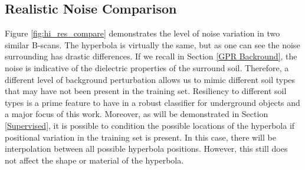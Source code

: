 \subsection{Realistic Noise Comparison}\label{background comparison}
\hspace{0.5in}Figure \ref{fig:hi_res_compare} demonstrates the level of noise variation in two similar B-scans. The hyperbola is virtually the same, but as one can see the noise surrounding has drastic differences. If we recall in Section \ref{GPR Backround}, the noise is indicative of the dielectric properties of the surround soil. Therefore, a different level of background perturbation allows us to mimic different soil types that may have not been present in the training set. Resiliency to different soil types is a prime feature to have in a robust classifier for underground objects and a major focus of this work.  Moreover, as will be demonstrated in Section \ref{Supervised}, it is possible to condition the possible locations of the hyperbola if positional variation in the training set is present. In this case, there will be interpolation between all possible hyperbola positions. However, this still does not affect the shape or material of the hyperbola.
\vspace{0.5\baselineskip}

